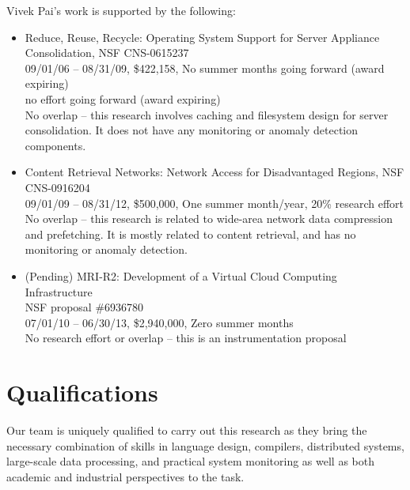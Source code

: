 \documentclass[12pt]{article}
\begin{document}
\noindent
Vivek Pai's work is supported by the following:

\begin{itemize}


\item Reduce, Reuse, Recycle:  Operating System Support for Server Appliance Consolidation, 
NSF CNS-0615237\\
09/01/06 -- 08/31/09, \$422,158, No summer months going forward (award expiring) \\
no effort going forward (award expiring) \\
No overlap -- this research involves caching and filesystem design for server
consolidation. It does not have any monitoring or anomaly detection components.

\item Content Retrieval Networks:  Network Access for Disadvantaged Regions, 
NSF CNS-0916204\\
09/01/09 -- 08/31/12, \$500,000, One summer month/year,
20\% research effort \\
No overlap -- this research is related to wide-area network data compression and prefetching. It is mostly related to content retrieval, and has no
monitoring or anomaly detection.

\item (Pending) MRI-R2: Development of a Virtual Cloud Computing Infrastructure \\
NSF proposal \#6936780\\
07/01/10 -- 06/30/13, \$2,940,000, Zero summer months \\
No research effort or overlap -- this is an instrumentation proposal


\end{itemize}





\newpage
\section{Qualifications}

Our team is uniquely qualified to carry out this research as they
bring the necessary combination of skills in language design,
compilers, distributed systems, large-scale data processing, and
practical system monitoring as well as both academic and industrial
perspectives to the task.  
\end{document}
